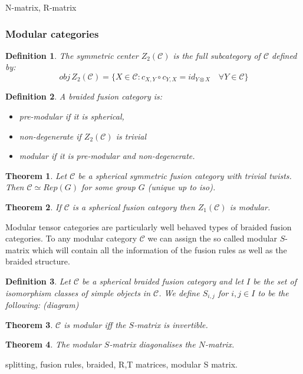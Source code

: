 \documentclass{article}
\newtheorem{definition}{Definition}
\newtheorem{theorem}{Theorem}
\begin{document}
N-matrix, R-matrix


\subsubsection{Modular categories}

\begin{definition}
The symmetric center $Z_2(\mathcal{C})$ is the full subcategory of $\mathcal{C}$ defined by:
$$ obj \, Z_2(\mathcal{C}) = \{ X\in \mathcal{C} : c_{X,Y} \circ c_{Y,X} = id_{Y\otimes X} \quad \forall Y \in \mathcal{C} \} $$
\end{definition}
\begin{definition}
A braided fusion category is:
\begin{itemize}
    \item pre-modular if it is spherical,
    \item non-degenerate if $Z_2(\mathcal{C})$ is trivial
    \item modular if it is pre-modular and non-degenerate.
\end{itemize}
\end{definition}

\begin{theorem}
Let $\mathcal{C}$ be a spherical symmetric fusion category with trivial twists. Then $\mathcal{C} \simeq Rep(G)$ for some group $G$ (unique up to iso).
\end{theorem}

\begin{theorem}
If $\mathcal{C}$ is a spherical fusion category then $Z_1(\mathcal{C})$ is modular.
\end{theorem}
Modular tensor categories are particularly well behaved types of braided fusion categories. To any modular category $\mathcal{C}$ we can assign the so called modular $S$-matrix which will contain all the information of the fusion rules as well as the braided structure.
\begin{definition}
Let $\mathcal{C}$ be a spherical braided fusion category and let $I$ be the set of isomorphism classes of simple objects in $\mathcal{C}$. We define $S_{i,j}$ for $i,j \in I$ to be the following: (diagram)
\end{definition}
\begin{theorem}
$\mathcal{C}$ is modular iff the $S$-matrix is invertible.
\end{theorem}
\begin{theorem}
The modular $S$-matrix diagonalises the $N$-matrix.
\end{theorem}
splitting, fusion rules, braided, R,T matrices, modular S matrix.
\end{document}
